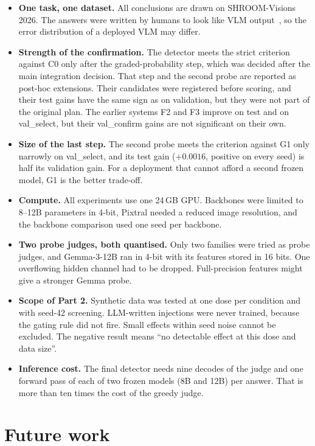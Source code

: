 \begin{itemize}
    \item \textbf{One task, one dataset.} All conclusions are drawn on SHROOM-Visions 2026. The answers were written by humans to look like VLM output~\cite{mickus2026humansdreamelectricsheep}, so the error distribution of a deployed VLM may differ.
    \item \textbf{Strength of the confirmation.} The detector meets the strict criterion against C0 only after the graded-probability step, which was decided after the main integration decision. That step and the second probe are reported as post-hoc extensions. Their candidates were registered before scoring, and their test gains have the same sign as on validation, but they were not part of the original plan. The earlier systems F2 and F3 improve on test and on val\_select, but their val\_confirm gains are not significant on their own.
    \item \textbf{Size of the last step.} The second probe meets the criterion against G1 only narrowly on val\_select, and its test gain ($+0.0016$, positive on every seed) is half its validation gain. For a deployment that cannot afford a second frozen model, G1 is the better trade-off.
    \item \textbf{Compute.} All experiments use one 24\,GB GPU. Backbones were limited to 8--12B parameters in 4-bit, Pixtral needed a reduced image resolution, and the backbone comparison used one seed per backbone.
    \item \textbf{Two probe judges, both quantised.} Only two families were tried as probe judges, and Gemma-3-12B ran in 4-bit with its features stored in 16 bits. One overflowing hidden channel had to be dropped. Full-precision features might give a stronger Gemma probe.
    \item \textbf{Scope of Part 2.} Synthetic data was tested at one dose per condition and with seed-42 screening. LLM-written injections were never trained, because the gating rule did not fire. Small effects within seed noise cannot be excluded. The negative result means ``no detectable effect at this dose and data size''.
    \item \textbf{Inference cost.} The final detector needs nine decodes of the judge and one forward pass of each of two frozen models (8B and 12B) per answer. That is more than ten times the cost of the greedy judge.
\end{itemize}

\section{Future work}

